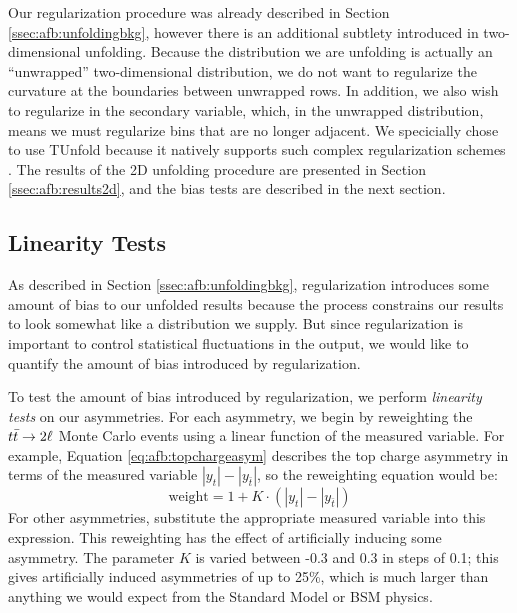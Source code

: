 Our regularization procedure was already described in Section
\ref{ssec:afb:unfoldingbkg}, however there is an additional subtlety
introduced in two-dimensional unfolding. Because the distribution we
are unfolding is actually an ``unwrapped'' two-dimensional
distribution, we do not want to regularize the curvature at the
boundaries between unwrapped rows. In addition, we also wish to
regularize in the secondary variable, which, in the unwrapped
distribution, means we must regularize bins that are no longer
adjacent. We specicially chose to use TUnfold because it natively supports such
complex regularization schemes \cite{tunfold}. The results of the 2D unfolding
procedure are presented in Section \ref{ssec:afb:results2d}, and the
bias tests are described in the next section.

\subsection{Linearity Tests}
\label{ssec:afb:unfoldingtests}

As described in Section \ref{ssec:afb:unfoldingbkg}, regularization
introduces some amount of bias to our unfolded results because the
process constrains our results to look somewhat like a distribution
we supply. But since regularization is important to
control statistical fluctuations in the output, we would like to
quantify the amount of bias introduced by regularization.

To test the amount of bias introduced by regularization, we perform
\emph{linearity tests} on our asymmetries. For each asymmetry, we
begin by reweighting the $t\bar{t} \rightarrow 2\ell$ Monte Carlo events using a linear
function of the measured variable. For example, Equation
\ref{eq:afb:topchargeasym} describes the top charge asymmetry in terms
of the measured variable $|y_t| - |y_{\bar{t}}|$, so the reweighting
equation would be:
\begin{equation}
\text{weight} = 1 + K \cdot (|y_t| - |y_{\bar{t}}|)
\end{equation}
For other asymmetries, substitute the appropriate measured variable
into this expression. This reweighting has the effect of artificially
inducing some asymmetry. The parameter $K$ is varied between -0.3 and 0.3
in steps of 0.1; this gives artificially induced asymmetries of up to
25\%, which is much larger than anything we would expect from the
Standard Model or BSM physics.

